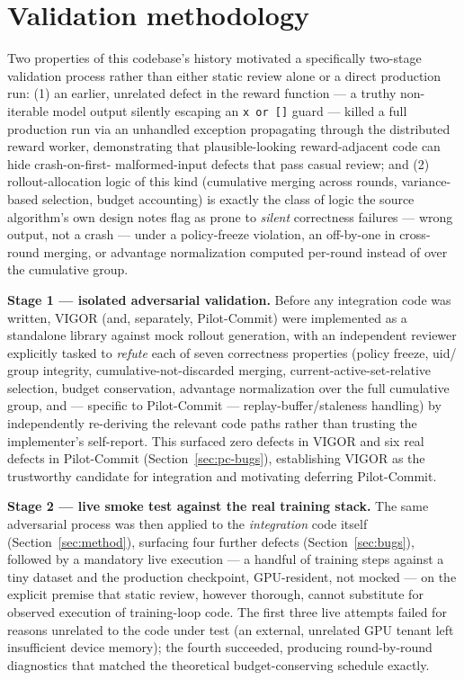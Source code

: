 \documentclass[11pt]{article}
\begin{document}
\section{Validation methodology}
\label{sec:validation}

Two properties of this codebase's history motivated a specifically two-stage
validation process rather than either static review alone or a direct production
run: (1) an earlier, unrelated defect in the reward function — a truthy non-iterable
model output silently escaping an \texttt{x or []} guard — killed a full production
run via an unhandled exception propagating through the distributed reward worker,
demonstrating that plausible-looking reward-adjacent code can hide crash-on-first-
malformed-input defects that pass casual review; and (2) rollout-allocation logic of
this kind (cumulative merging across rounds, variance-based selection, budget
accounting) is exactly the class of logic the source algorithm's own design notes
flag as prone to \emph{silent} correctness failures — wrong output, not a crash —
under a policy-freeze violation, an off-by-one in cross-round merging, or advantage
normalization computed per-round instead of over the cumulative group.

\textbf{Stage 1 — isolated adversarial validation.} Before any integration code was
written, VIGOR (and, separately, Pilot-Commit) were implemented as a standalone
library against mock rollout generation, with an independent reviewer explicitly
tasked to \emph{refute} each of seven correctness properties (policy freeze, uid/
group integrity, cumulative-not-discarded merging, current-active-set-relative
selection, budget conservation, advantage normalization over the full cumulative
group, and — specific to Pilot-Commit — replay-buffer/staleness handling) by
independently re-deriving the relevant code paths rather than trusting the
implementer's self-report. This surfaced zero defects in VIGOR and six real defects
in Pilot-Commit (Section~\ref{sec:pc-bugs}), establishing VIGOR as the trustworthy
candidate for integration and motivating deferring Pilot-Commit.

\textbf{Stage 2 — live smoke test against the real training stack.} The same
adversarial process was then applied to the \emph{integration} code itself
(Section~\ref{sec:method}), surfacing four further defects (Section~\ref{sec:bugs}),
followed by a mandatory live execution — a handful of training steps against a tiny
dataset and the production checkpoint, GPU-resident, not mocked — on the explicit
premise that static review, however thorough, cannot substitute for observed
execution of training-loop code. The first three live attempts failed for reasons
unrelated to the code under test (an external, unrelated GPU tenant left
insufficient device memory); the fourth succeeded, producing round-by-round
diagnostics that matched the theoretical budget-conserving schedule exactly.
\end{document}
